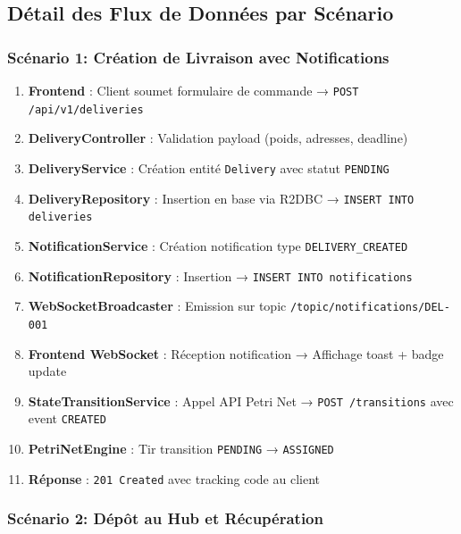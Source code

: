 \subsection{Détail des Flux de Données par Scénario}

\subsubsection{Scénario 1: Création de Livraison avec Notifications}

\begin{enumerate}
    \item \textbf{Frontend} : Client soumet formulaire de commande → \texttt{POST /api/v1/deliveries}
    \item \textbf{DeliveryController} : Validation payload (poids, adresses, deadline)
    \item \textbf{DeliveryService} : Création entité \texttt{Delivery} avec statut \texttt{PENDING}
    \item \textbf{DeliveryRepository} : Insertion en base via R2DBC → \texttt{INSERT INTO deliveries}
    \item \textbf{NotificationService} : Création notification type \texttt{DELIVERY\_CREATED}
    \item \textbf{NotificationRepository} : Insertion → \texttt{INSERT INTO notifications}
    \item \textbf{WebSocketBroadcaster} : Emission sur topic \texttt{/topic/notifications/DEL-001}
    \item \textbf{Frontend WebSocket} : Réception notification → Affichage toast + badge update
    \item \textbf{StateTransitionService} : Appel API Petri Net → \texttt{POST /transitions} avec event \texttt{CREATED}
    \item \textbf{PetriNetEngine} : Tir transition \texttt{PENDING} → \texttt{ASSIGNED}
    \item \textbf{Réponse} : \texttt{201 Created} avec tracking code au client
\end{enumerate}

\subsubsection{Scénario 2: Dépôt au Hub et Récupération}

